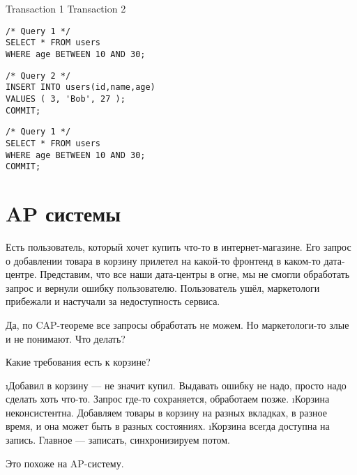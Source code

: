 \begin{minipage}{.45\linewidth}
\hfil Transaction 1 \hfil   \hfil Transaction 2 \hfil
\begin{flushleft}\begin{minipage}{.6\textwidth}
\begin{verbatim}
/* Query 1 */
SELECT * FROM users
WHERE age BETWEEN 10 AND 30;
\end{verbatim}
\end{minipage}\end{flushleft}

\begin{flushright}\begin{minipage}{.6\textwidth}
\begin{verbatim}
/* Query 2 */
INSERT INTO users(id,name,age)
VALUES ( 3, 'Bob', 27 );
COMMIT;
\end{verbatim}
\end{minipage}
\end{flushright}

\begin{flushleft}\begin{minipage}{.6\textwidth}
\begin{verbatim}
/* Query 1 */
SELECT * FROM users
WHERE age BETWEEN 10 AND 30;
COMMIT;
\end{verbatim}
\end{minipage}\end{flushleft}
\end{minipage}
    

\section{AP системы}
Есть пользователь, который хочет купить что-то в интернет-магазине. Его запрос о добавлении товара в корзину прилетел на какой-то фронтенд в каком-то дата-центре. Представим, что все наши дата-центры в огне, мы не смогли обработать запрос и вернули ошибку пользователю. Пользователь ушёл, маркетологи прибежали и настучали за недоступность сервиса. 

Да, по CAP-теореме все запросы обработать не можем. Но маркетологи-то злые и не понимают. Что делать?

Какие требования есть к корзине?
\begin{enumerate}
\i Добавил в корзину --- не значит купил. Выдавать ошибку не надо, просто надо сделать хоть что-то. Запрос где-то сохраняется, обработаем позже.
\i Корзина неконсистентна. Добавляем товары в корзину на разных вкладках, в разное время, и она может быть в разных состояниях.
\i Корзина всегда доступна на запись. Главное --- записать, синхронизируем потом.
\end{enumerate}
Это похоже на AP-систему.


